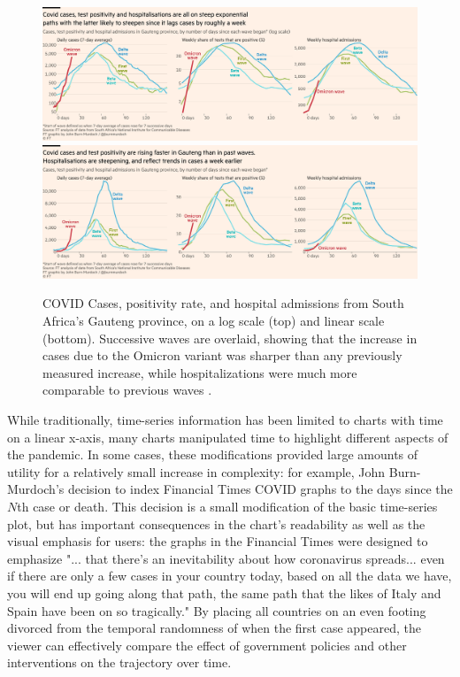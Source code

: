 \documentclass[article]{jdssv}\usepackage[]{graphicx}\usepackage[]{xcolor}
\begin{document}
\begin{figure}\centering
\includegraphics[width=\linewidth]{ft-waves}\\
\includegraphics[width=\linewidth]{ft-waves-linear}
\caption{COVID Cases, positivity rate, and hospital admissions from South Africa's Gauteng province, on a log scale (top) and linear scale (bottom). Successive waves are overlaid, showing that the increase in cases due to the Omicron variant was sharper than any previously measured increase, while hospitalizations were much more comparable to previous waves \citep{burn-murdoch_new_2021-1}.}
\label{fig:ft-waves}
\end{figure}

While traditionally, time-series information has been limited to charts with time on a linear x-axis, many charts manipulated time to highlight different aspects of the pandemic. In some cases, these modifications provided large amounts of utility for a relatively small increase in complexity: for example, John Burn-Murdoch's decision to index Financial Times COVID graphs to the days since the $N$th case or death. This decision is a small modification of the basic time-series plot, but has important consequences in the chart's readability as well as the visual emphasis for users: the graphs in the Financial Times were designed to emphasize "... that there's an inevitability about how coronavirus spreads... even if there are only a few cases in your country today, based on all the data we have, you will end up going along that path, the same path that the likes of Italy and Spain have been on so tragically."\citep{hannenCoronavirusTrajectoryTracker2020a} By placing all countries on an even footing divorced from the temporal randomness of when the first case appeared, the viewer can effectively compare the effect of government policies and other interventions on the trajectory over time\citep{burn-murdochAllCountriesDeath2020,burn-murdochLatestCaseTrajectories2020}. 
\end{document}
